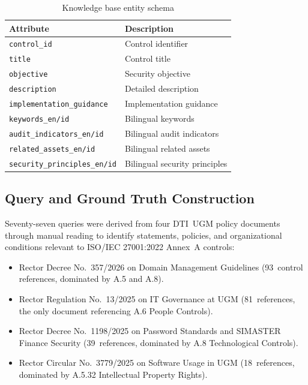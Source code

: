 \documentclass[conference]{IEEEtran}
\begin{document}
\begin{table}[H]
\centering
\caption{Knowledge base entity schema}
\label{tab:kb-schema}
\small
\begin{tabular}{@{}ll@{}}
\toprule
Attribute & Description \\
\midrule
\texttt{control\_id} & Control identifier \\
\texttt{title} & Control title \\
\texttt{objective} & Security objective \\
\texttt{description} & Detailed description \\
\texttt{implementation\_guidance} & Implementation guidance \\
\texttt{keywords\_en/id} & Bilingual keywords \\
\texttt{audit\_indicators\_en/id} & Bilingual audit indicators \\
\texttt{related\_assets\_en/id} & Bilingual related assets \\
\texttt{security\_principles\_en/id} & Bilingual security principles \\
\bottomrule
\end{tabular}
\end{table}

\subsection{Query and Ground Truth Construction}

Seventy-seven queries were derived from four DTI~UGM policy documents through
manual reading to identify statements, policies, and organizational conditions
relevant to ISO/IEC 27001:2022 Annex~A controls:

\begin{itemize}
  \item Rector Decree No.~357/2026 on Domain Management Guidelines
        (93~control references, dominated by A.5 and A.8).
  \item Rector Regulation No.~13/2025 on IT Governance at UGM
        (81~references, the only document referencing A.6 People Controls).
  \item Rector Decree No.~1198/2025 on Password Standards and SIMASTER
        Finance Security (39~references, dominated by A.8 Technological Controls).
  \item Rector Circular No.~3779/2025 on Software Usage in UGM
        (18~references, dominated by A.5.32 Intellectual Property Rights).
\end{itemize}
\end{document}
